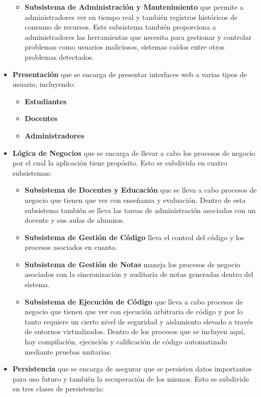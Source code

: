 \begin{itemize}
\begin{itemize}
        \item \textbf{Subsistema de Administración y Mantenimiento} que permite a administradores ver en tiempo real y también registros históricos de consumo de recursos. Este subsistema también proporciona a administradores las herramientas que necesita para gestionar y controlar problemas como usuarios maliciosos, sistemas caídos entre otros problemas detectados.
    \end{itemize}
    \item \textbf{Presentación} que se encarga de presentar interfaces web a varias tipos de usuario, incluyendo:
    \begin{itemize}
    	\item \textbf{Estudiantes}
		\item \textbf{Docentes}
		\item \textbf{Administradores}
    \end{itemize}
    \item \textbf{Lógica de Negocios} que se encarga de llevar a cabo los procesos de negocio por el cual la aplicación tiene propósito. Esto se subdivida en cuatro subsistemas:
    \begin{itemize}
    	\item \textbf{Subsistema de Docentes y Educación} que se lleva a cabo procesos de negocio que tienen que ver con enseñanza y evaluación. Dentro de esta subsistema también se lleva las tareas de administración asociadas con un docente y sus aulas de alumnos.
        \item \textbf{Subsistema de Gestión de Código} lleva el control del código y los procesos asociados en cuanto.
        \item \textbf{Subsistema de Gestión de Notas} maneja los procesos de negocio asociados con la sincronización y auditoría de notas generadas dentro del sistema.
        \item \textbf{Subsistema de Ejecución de Código} que lleva a cabo procesos de negocio que tienen que ver con ejecución arbitraria de código y por lo tanto requiere un cierto nivel de seguridad y aislamiento elevado a través de entornos virtualizados. Dentro de los procesos que se incluyen aquí, hay compilación, ejecución y calificación de código automatizado mediante pruebas unitarias.
    \end{itemize}
    \item \textbf{Persistencia} que se encarga de asegurar que se persisten datos importantes para uso futuro y también la recuperación de los mismos. Esto se subdivide en tres clases de persistencia:

\end{itemize}
